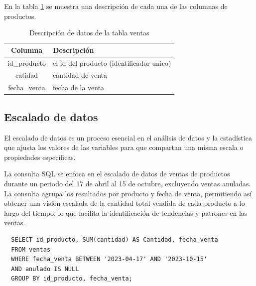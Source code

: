 En la tabla \ref{tab:ventas_fechas} se muestra una descripción de cada una de las columnas de productos.

\begin{table}[H]

  \begin{tabular}{|c|l|}  %
    \hline
    \rowcolor{gray!50} \textbf{Columna} & \textbf{Descripción} \\
    \hline
    id\_producto &  el id del producto (identificador unico)\\
    catidad & cantidad de venta \\
    fecha\_venta & fecha de la venta \\
    \hline
  \end{tabular}
  \centering
  \caption{ Descripción de datos de la tabla ventas}
  \label{tab:ventas_fechas} %
\end{table}



\subsection{Escalado de datos}

El escalado de datos es un proceso esencial en el análisis de datos y la estadística que ajusta los valores de las variables para que compartan una misma escala o propiedades específicas.

La consulta SQL se enfoca en el escalado de datos de ventas de productos durante un periodo del 17 de abril al 15 de octubre, excluyendo ventas anuladas. La consulta agrupa los resultados por producto y fecha de venta, permitiendo así obtener una visión escalada de la cantidad total vendida de cada producto a lo largo del tiempo, lo que facilita la identificación de tendencias y patrones en las ventas.

\begin{verbatim}
  SELECT id_producto, SUM(cantidad) AS Cantidad, fecha_venta
  FROM ventas
  WHERE fecha_venta BETWEEN '2023-04-17' AND '2023-10-15'
  AND anulado IS NULL
  GROUP BY id_producto, fecha_venta;
\end{verbatim}


